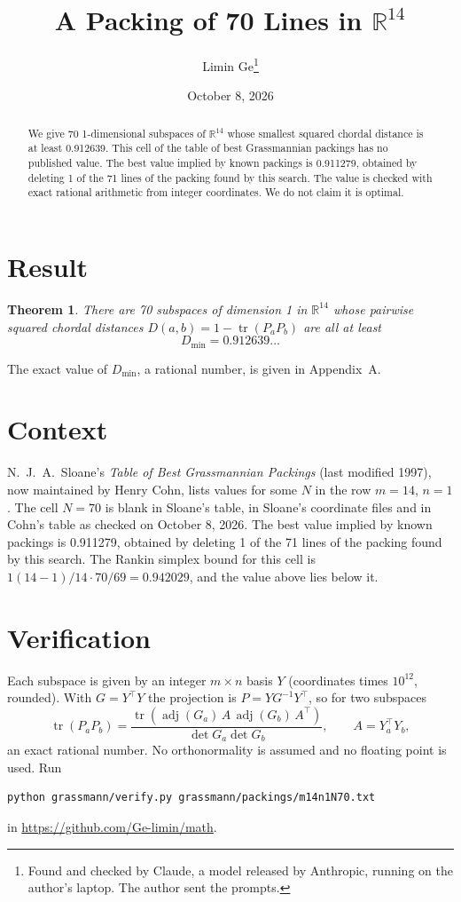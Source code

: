 \documentclass[11pt,a4paper]{article}
\title{A Packing of 70 Lines in $\mathbb{R}^{14}$}
\author{Limin Ge\thanks{Found and checked by Claude, a model released by Anthropic, running on the author's laptop. The author sent the prompts.}}
\date{October 8, 2026}
\newtheorem*{theorem}{Theorem}
\begin{document}
\maketitle
\begin{abstract}
We give 70 1-dimensional subspaces of $\mathbb{R}^{14}$ whose smallest squared chordal distance is at least 0.912639. This cell of the table of best Grassmannian packings has no published value. The best value implied by known packings is 0.911279, obtained by deleting 1 of the 71 lines of the packing found by this search. The value is checked with exact rational arithmetic from integer coordinates. We do not claim it is optimal.
\end{abstract}

\section{Result}
\begin{theorem}
There are 70 subspaces of dimension 1 in $\mathbb{R}^{14}$ whose pairwise squared chordal distances $D(a,b) = 1 - \operatorname{tr}(P_aP_b)$ are all at least
\[ D_{\min} = 0.912639\ldots \]
\end{theorem}
The exact value of $D_{\min}$, a rational number, is given in Appendix~A.


\section{Context}
N.~J.~A.~Sloane's \emph{Table of Best Grassmannian Packings} (last modified 1997), now maintained by Henry Cohn, lists values for some $N$ in the row $m=14$, $n=1$. The cell $N=70$ is blank in Sloane's table, in Sloane's coordinate files and in Cohn's table as checked on October 8, 2026. The best value implied by known packings is 0.911279, obtained by deleting 1 of the 71 lines of the packing found by this search. The Rankin simplex bound for this cell is $1(14-1)/14\cdot 70/69 = 0.942029$, and the value above lies below it.


\section{Verification}
Each subspace is given by an integer $m\times n$ basis $Y$ (coordinates times $10^{12}$, rounded). With $G=Y^\top Y$ the projection is $P=YG^{-1}Y^\top$, so for two subspaces
\[ \operatorname{tr}(P_aP_b)=\frac{\operatorname{tr}(\operatorname{adj}(G_a)\,A\,\operatorname{adj}(G_b)\,A^\top)}{\det G_a\det G_b},\qquad A=Y_a^\top Y_b, \]
an exact rational number. No orthonormality is assumed and no floating point is used. Run
\begin{verbatim}
python grassmann/verify.py grassmann/packings/m14n1N70.txt
\end{verbatim}
in \url{https://github.com/Ge-limin/math}.
\end{document}
